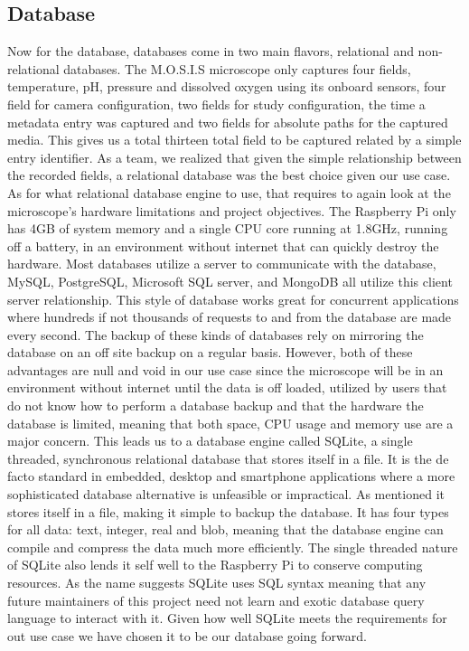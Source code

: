 \subsection{Database}
Now for the database, databases come in two main flavors, relational and non-relational databases. The M.O.S.I.S microscope only captures four fields, temperature, pH, pressure and dissolved oxygen using its onboard sensors, four field for camera configuration, two fields for study configuration, the time a metadata entry was captured and two fields for absolute paths for the captured media. This gives us a total thirteen total field to be captured related by a simple entry identifier. As a team, we realized that given the simple relationship  between the recorded fields, a relational database was the best choice given our use case.\\
As for what relational database engine to use, that requires to again look at the microscope's hardware limitations and project objectives. The Raspberry Pi only has 4GB of system memory and a single CPU core running at 1.8GHz, running off a battery, in an environment without internet that can quickly destroy the hardware. Most databases utilize a server to communicate with the database, MySQL, PostgreSQL, Microsoft SQL server, and MongoDB all utilize this client server relationship. This style of database works great for concurrent applications where hundreds if not thousands of requests to and from the database are made every second. The backup of these kinds of databases rely on mirroring the database on an off site backup on a regular basis. However, both of these advantages are null and void in our use case since the microscope will be in an environment without internet until the data is off loaded, utilized by users that do not know how to perform a database backup and that the hardware the database is limited, meaning that both space, CPU usage and memory use are a major concern. This leads us to a database engine called SQLite, a single threaded, synchronous relational database that stores itself in a file. It is the de facto standard in embedded, desktop and smartphone applications where a more sophisticated database alternative is unfeasible or impractical. As mentioned it stores itself in a file, making it simple to backup the database. It has four types for all data: text, integer, real and blob, meaning that the database engine can compile and compress the data much more efficiently. The single threaded nature of SQLite also lends it self well to the Raspberry Pi to conserve computing resources. As the name suggests SQLite uses SQL syntax meaning that any future maintainers of this project need not learn and exotic database query language to interact with it. Given how well SQLite meets the requirements for out use case we have chosen it to be our database going forward.